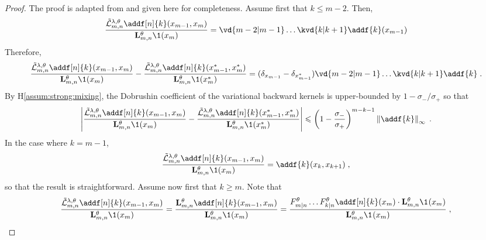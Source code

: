 \documentclass{article}
\begin{document}
\begin{proof}
The proof is adapted from  \cite[Lemma~D.3]{gloaguen2022pseudo} and given here for completeness. Assume first that $k\leq m-2$. Then,
$$
\frac{\tilde{\mathcal{L}}^{\parvar,\parvec}_{m, n}\addf[n]{k}(x_{m-1},x_m) }{\uk{m, n}{\parvec}\1(x_m)} = \vd{m-2 \vert m-1}\ldots \kvd{k \vert k+1}\addf{k}(x_{m-1})
$$
Therefore,
$$
\frac{\tilde{\mathcal{L}}^{\parvar,\parvec}_{m, n}\addf[n]{k}(x_{m-1},x_m) }{\uk{m, n}{\parvec}\1(x_m)} - \frac{\tilde{\mathcal{L}}^{\parvar,\parvec}_{m, n}\addf[n]{k}(x^*_{m-1},x^*_m) }{\uk{m, n}{\parvec}\1(x^*_m)} =  (\delta_{x_{m-1}}-\delta_{x^*_{m-1}})\vd{m-2 \vert m-1} \ldots \kvd{k \vert k+1}\addf{k}\eqsp.
$$
By H\ref{assum:strong:mixing}, the Dobrushin coefficient of the variational backward kernels is upper-bounded by $1-\sigma_-/\sigma_+$ so that 
$$
\left|\frac{\tilde{\mathcal{L}}^{\parvar,\parvec}_{m, n}\addf[n]{k}(x_{m-1},x_m) }{\uk{m, n}{\parvec}\1(x_m)} - \frac{\tilde{\mathcal{L}}^{\parvar,\parvec}_{m, n}\addf[n]{k}(x^*_{m-1},x^*_m) }{\uk{m, n}{\parvec}\1(x^*_m)} \right|\leqslant  \left(1-\frac{\sigma_-}{\sigma_+}\right)^{m-k-1}\left\|\addf{k}\right\|_\infty\eqsp.
$$
In the case where $k = m-1$, 
$$
\frac{\tilde{\mathcal{L}}^{\parvar,\parvec}_{m, n}\addf[n]{k}(x_{m-1},x_m) }{\uk{m, n}{\parvec}\1(x_m)} = \addf{k}(x_{k},x_{k+1})\eqsp,
$$
so that the result is straightforward. 
Assume now first that $k\geq m$. Note that 
$$
\frac{\tilde{\mathcal{L}}^{\parvar,\parvec}_{m, n}\addf[n]{k}(x_{m-1},x_m) }{\uk{m, n}{\parvec}\1(x_m)} = \frac{\uk{m, n}{\parvec}\addf[n]{k}(x_{m-1},x_m) }{\uk{m, n}{\parvec}\1(x_m)} = \frac{F^\parvec_{m|n}\ldots F^\parvec_{k|n}\addf[n]{k}(x_m)\cdot\uk{m, n}{\parvec}\1_{}(x_m)}{\uk{m, n}{\parvec}\1_{}(x_m)}\eqsp,
$$
\end{proof}
\end{document}

